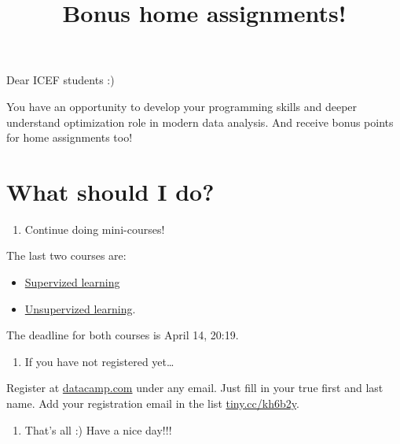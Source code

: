 \documentclass[11pt,russian,]{article}
\title{Bonus home assignments!}
\author{}
\date{}
\providecommand{\tightlist}{%
  \setlength{\itemsep}{0pt}\setlength{\parskip}{0pt}}
\begin{document}
\maketitle

Dear ICEF students :)

You have an opportunity to develop your programming skills and deeper
understand optimization role in modern data analysis. And receive bonus
points for home assignments too!

\hypertarget{what-should-i-do}{%
\section{What should I do?}\label{what-should-i-do}}

\begin{enumerate}
\def\labelenumi{\arabic{enumi}.}
\tightlist
\item
  Continue doing mini-courses!
\end{enumerate}

The last two courses are:

\begin{itemize}
\tightlist
\item
  \href{https://www.datacamp.com/courses/supervised-learning-with-scikit-learn}{Supervized
  learning}
\item
  \href{https://www.datacamp.com/courses/unsupervised-learning-in-python}{Unsupervized
  learning}.
\end{itemize}

The deadline for both courses is April 14, 20:19.

\begin{enumerate}
\def\labelenumi{\arabic{enumi}.}
\setcounter{enumi}{1}
\tightlist
\item
  If you have not registered yet\ldots{}
\end{enumerate}

Register at \href{https://datacamp.com}{datacamp.com} under any email.
Just fill in your true first and last name. Add your registration email
in the list \href{https://tiny.cc/kh6b2y}{tiny.cc/kh6b2y}.

\begin{enumerate}
\def\labelenumi{\arabic{enumi}.}
\setcounter{enumi}{2}
\tightlist
\item
  That's all :) Have a nice day!!!
\end{enumerate}
\end{document}
